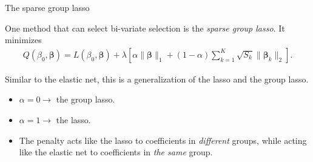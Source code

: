 \documentclass[8pt]{beamer}
\newcommand{\mys}{\vspace{0.5cm} \pause
}
\newcommand{\mysa}{\vspace{0.2cm} \pause
}
\begin{document}
\begin{frame}{The sparse group lasso}

One method that can select bi-variate selection is the \textit{sparse group lasso}. It minimizes 
\begin{align}
    \label{sparsegrouoplasso}
    Q(\beta_0, \bm{\beta}) = L(\beta_0, \bm{\beta}) + \lambda \left[ \alpha \| \bm{\beta} \|_1 + (1 - \alpha) \sum_{k=1}^K \sqrt{S_k}  \| \bm{\beta}_k \|_2 \right].
\end{align} \mysa

Similar to the elastic net, this is a generalization of the lasso and the group lasso.
\begin{itemize}
    \item $\alpha = 0 \to$ the group lasso.
    \item $\alpha = 1 \to$ the lasso.
    \item The penalty acts like the lasso to coefficients in \textit{different} groups, while acting like the elastic net to coefficients in \textit{the same} group.
\end{itemize} %

    
\end{frame}
\end{document}
